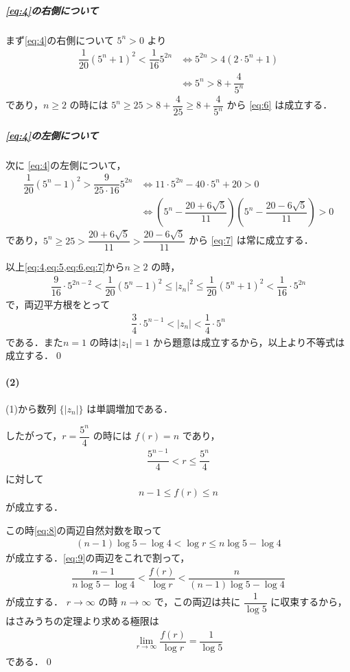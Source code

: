\documentclass[../../main.tex]{subfiles}
\begin{document}
\subparagraph{\cref{eq:4}の右側について}
まず\cref{eq:4}の右側について $5^n>0$ より
\begin{align}
  \dfrac{1}{20}(5^n+1)^2 < \dfrac{1}{16} 5^{2n} &\iff 5^{2n} > 4(2\cdot 5^n+1) \\
  &\iff 5^n > 8 + \dfrac{4}{5^n} \label{eq:6}
\end{align}
であり，$n \ge 2$ の時には $5^n \ge 25 > 8 + \dfrac{4}{25} \ge 8 + \dfrac{4}{5^n}$ から \cref{eq:6} は成立する．

\subparagraph{\cref{eq:4}の左側について}
次に \cref{eq:4}の左側について，
\begin{align}
  \dfrac{1}{20}(5^n-1)^2 > \dfrac{9}{25 \cdot 16} 5^{2n}
  &\iff
  11\cdot 5^{2n} - 40\cdot 5^{n} + 20 > 0 \\
  &\iff
  \left( 5^n - \dfrac{20 + 6\sqrt{5}}{11} \right) \left( 5^n - \dfrac{20 - 6\sqrt{5}}{11} \right) > 0 \label{eq:7}
\end{align}
であり，$5^n \ge 25 > \dfrac{20 + 6\sqrt{5}}{11} > \dfrac{20 - 6\sqrt{5}}{11}$ から \cref{eq:7} は常に成立する．
\casesend

以上\cref{eq:4,eq:5,eq:6,eq:7}から$n \ge 2$ の時，
\begin{align}
  \dfrac{9}{16} \cdot 5^{2n-2} < \dfrac{1}{20}(5^n-1)^2 \le |z_n|^2 \le \dfrac{1}{20}(5^n+1)^2 < \dfrac{1}{16} \cdot 5^{2n}
\end{align}
で，両辺平方根をとって
\begin{align}
  \dfrac{3}{4} \cdot 5^{n-1} < |z_n| < \dfrac{1}{4} \cdot 5^n
\end{align}
である．また$n=1$ の時は$|z_1|=1$ から題意は成立するから，以上より不等式は成立する．\qed

\paragraph{(2)}

(1)から数列 $\{|z_n|\}$ は単調増加である．

したがって，$r = \dfrac{5^n}{4}$ の時には $f(r) = n$ であり，
\begin{align}
  \dfrac{5^{n-1}}{4} < r \le \dfrac{5^n}{4} \label{eq:8}
\end{align}
に対して
\begin{align}
  n-1 \le f(r) \le n \label{eq:9}
\end{align}
が成立する．

この時\cref{eq:8}の両辺自然対数を取って
\begin{align}
  (n-1)\log 5 - \log 4 < \log r \le n\log 5 - \log 4
\end{align}
が成立する．\cref{eq:9}の両辺をこれで割って，
\begin{align}
  \dfrac{n-1}{n\log 5 - \log 4} < \dfrac{f(r)}{\log r} < \dfrac{n}{(n-1)\log 5 - \log 4}
\end{align}
が成立する．
$r \to \infty$ の時 $n \to \infty$ で，この両辺は共に $\dfrac{1}{\log 5}$ に収束するから，はさみうちの定理より求める極限は
\begin{align}
  \lim_{r\to\infty} \dfrac{f(r)}{\log r} = \dfrac{1}{\log 5}
\end{align}
である．\qed

\newpage
\end{document}
